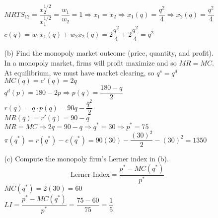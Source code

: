 \documentclass[11pt]{article}
\begin{document}
\begin{enumerate}
\begin{itemize}
    $MRTS_12=\dfrac{x_2^{1/2}}{x_1^{1/2}}=\dfrac{w_1}{w_2}=1\Rightarrow x_1=x_2\Rightarrow x_1(q)=\dfrac{q^2}{4}\Rightarrow x_2(q)=\dfrac{q^2}{4}$\\
    $c(q)=w_1x_1(q)+w_2x_2(q)=2\dfrac{q^2}{4}+2\dfrac{q^2}{4}=q^2$\\
    \item[(b)] Find the monopoly market outcome (price, quantity, and profit).
    \medskip\\
    In a monopoly market, firms will profit maximize and so $MR=MC$.\\
    At equilibrium, we must have market clearing, so $q^s=q^d$\\
    $MC(q)=c'(q)=2q$\\
    $q^d(p)=180-2p\Rightarrow p(q)=\dfrac{180-q}{2}$\\
    $r(q)=q\cdot p(q)=90q-\dfrac{q^2}{2}$\\
    $MR(q)=r'(q)=90-q$\\
    $MR=MC\Rightarrow2q=90-q\Rightarrow q^*=30\Rightarrow p^*=75$\\
    $\pi(q^*)=r(q^*)-c(q^*)=90(30)-\dfrac{(30)^2}{2}-(30)^2=1350$\\
    \item[(c)] Compute the monopoly firm's Lerner index in (b).
    \medskip\\
    $$\text{Lerner Index}=\dfrac{p^*-MC(q^*)}{p^*}$$
    $MC(q^*)=2(30)=60$\\
    $LI=\dfrac{p^*-MC(q^*)}{p^*}=\dfrac{75-60}{75}=\dfrac{1}{5}$\\
    \end{itemize}
\end{enumerate}
\end{document}

